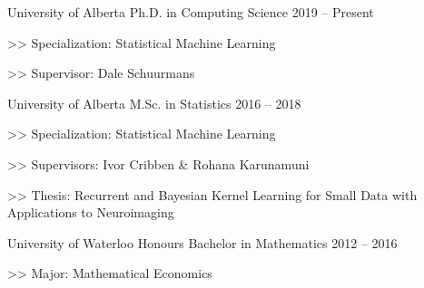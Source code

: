 \begin{cventries}
  \cventry
    {University of Alberta}
    {Ph.D. in Computing Science}
    {2019 -- Present}
    {
      \begin{cvitems}
        \item[>>] {Specialization: Statistical Machine Learning}
        \item[>>] {Supervisor: Dale Schuurmans}
      \end{cvitems}
    }

  \cventry
    {University of Alberta}
    {M.Sc. in Statistics}
    {2016 -- 2018}
    {
      \begin{cvitems}
        \item[>>] {Specialization: Statistical Machine Learning}
        \item[>>] {Supervisors: Ivor Cribben \& Rohana Karunamuni}
        \item[>>] {Thesis: Recurrent and Bayesian Kernel Learning for Small Data with Applications to Neuroimaging}
      \end{cvitems}
    }
  \cventry
    {University of Waterloo}
    {Honours Bachelor in Mathematics}
    {2012 -- 2016}
    {
      \begin{cvitems}
        \item[>>] Major: Mathematical Economics
      \end{cvitems}
    }
\end{cventries}

